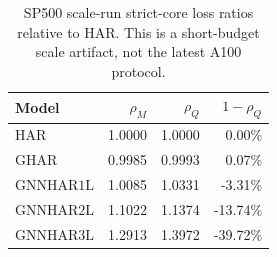 \begin{table}[H]
\centering
\small
\begin{tabular}{lrrr}
\toprule
Model & \(\rho_M\) & \(\rho_Q\) & \(1-\rho_Q\) \\
\midrule
\(\mathrm{HAR}\) & 1.0000 & 1.0000 & 0.00\% \\
\(\mathrm{GHAR}\) & 0.9985 & 0.9993 & 0.07\% \\
\(\mathrm{GNNHAR1L}\) & 1.0085 & 1.0331 & -3.31\% \\
\(\mathrm{GNNHAR2L}\) & 1.1022 & 1.1374 & -13.74\% \\
\(\mathrm{GNNHAR3L}\) & 1.2913 & 1.3972 & -39.72\% \\
\bottomrule
\end{tabular}
\caption{SP500 scale-run strict-core loss ratios relative to HAR.  This is a short-budget scale artifact, not the latest A100 protocol.}
\label{tab:sp500-core-loss}
\end{table}
